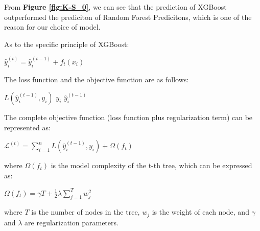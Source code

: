 From \textbf{Figure \ref{fig:K-S_0}}, we can see that the prediction of XGBoost outperformed the prediciton of Random Forest Predicitons, which is one of the reason for our choice of model.

As to the specific principle of XGBoost:

\begin{center}
    $\hat{y}_i^{(t)} = \hat{y}_i^{(t-1)} + f_t(x_i)$
\end{center}

The loss function and the objective function are as follows:

$L(\hat{y}_i^{(t-1)}, y_i)$ \quad {} $y_i$  $\hat{y}_i^{(t-1)}$

The complete objective function (loss function plus regularization term) can be represented as:
\begin{center}
    $\mathcal{L}^{(t)} = \sum_{i=1}^n L(\hat{y}_i^{(t-1)}, y_i) + \Omega(f_t)$
\end{center}

where $\Omega(f_t)$ is the model complexity of the t-th tree, which can be expressed as:

\begin{center}
    $\Omega(f_t) = \gamma T + \frac{1}{2} \lambda \sum_{j=1}^T w_j^2$
\end{center}

where $T$ is the number of nodes in the tree, $w_j$ is the weight of each node, and $\gamma$ and $\lambda$ are regularization parameters.

